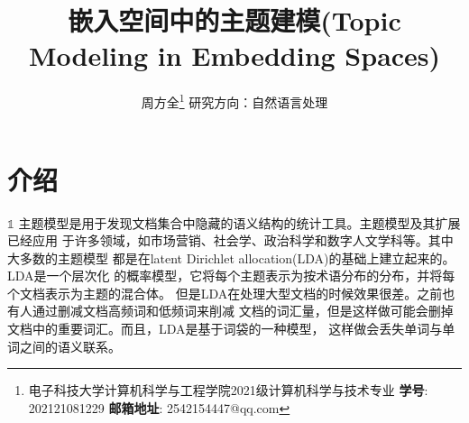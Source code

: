 \documentclass[twocolumn]{article}
\title{嵌入空间中的主题建模(Topic Modeling in Embedding Spaces)}
\author{{\small 周方全\footnote{电子科技大学计算机科学与工程学院2021级计算机科学与技术专业 \quad \textbf{学号}: 202121081229 \quad \textbf{邮箱地址}: 2542154447@qq.com} \quad\quad 研究方向：自然语言处理} }
\date{}
\begin{document}
\maketitle  %

\section{介绍}
	$\mathbb{1}$
    主题模型是用于发现文档集合中隐藏的语义结构的统计工具。主题模型及其扩展已经应用
    于许多领域，如市场营销、社会学、政治科学和数字人文学科等。其中大多数的主题模型
    都是在latent Dirichlet allocation(LDA)\cite{blei2003latent}的基础上建立起来的。LDA是一个层次化
    的概率模型，它将每个主题表示为按术语分布的分布，并将每个文档表示为主题的混合体。
    但是LDA在处理大型文档的时候效果很差。之前也有人通过删减文档高频词和低频词来削减
    文档的词汇量，但是这样做可能会删掉文档中的重要词汇。而且，LDA是基于词袋的一种模型，
    这样做会丢失单词与单词之间的语义联系。
    
\end{document}
